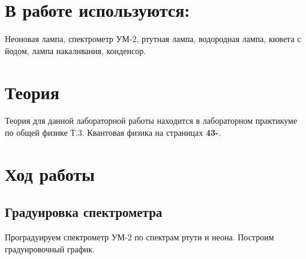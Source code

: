 \documentclass[14pt,a4paper]{scrartcl}
\begin{document}
\section{В работе используются:}

Неоновая лампа, спектрометр УМ-2, ртутная лампа, водородная лампа, кювета с йодом, лампа накаливания, конденсор.

\section{Теория}

Теория для данной лабораторной работы находится в лабораторном практикуме по общей физике Т.3. Квантовая физика на страницах \textbf{43-}.



\section{Ход работы}

\subsection{Градуировка спектрометра}

Проградуируем спектрометр УМ-2 по спектрам ртути и неона. Построим градуировочный график.

\newpage
\end{document}
